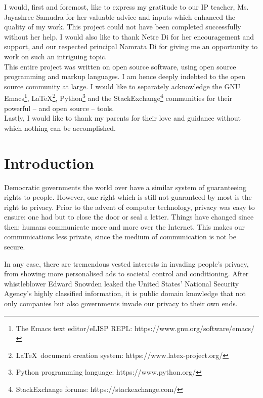 \documentclass{article}
\begin{document}
I would, first and foremost, like to express my gratitude to our IP teacher, Ms. Jayashree Samudra
for her valuable advice and inputs which enhanced the quality of my work. This project could not
have been completed successfully without her help. I would also like to thank Netre Di for her
encouragement and support, and our respected principal Namrata Di for giving me an opportunity to
work on such an intriguing topic. \\

This entire project was written on open source software, using open source programming and markup
languages. I am hence deeply indebted to the open source community at large. I would like to
separately acknowledge the GNU Emacs\footnote{The Emacs text editor/eLISP REPL:
https://www.gnu.org/software/emacs/}, \LaTeX\footnote{\LaTeX\ document creation system:
https://www.latex-project.org/}, Python\footnote{Python programming language:
https://www.python.org/} and the StackExchange\footnote{StackExchange forums:
https://stackexchange.com/} communities for their powerful -- and open source -- tools.\\

Lastly, I would like to thank my parents for their love and guidance without which nothing can be
accomplished.

\newpage

\tableofcontents

\newpage
\listoffigures


\newpage
\section{Introduction}
Democratic governments the world over have a similar system of guaranteeing rights to people.
However, one right which is still not guaranteed by most is the right to privacy. Prior to the
advent of computer technology, privacy was easy to ensure: one had but to close the door or seal a letter.
Things have changed since then: humans communicate more and more over the Internet. This makes our
communications less private, since the medium of communication is not be secure.

In any case, there are tremendous vested interests in invading people's privacy, from showing more
personalised ads to societal control and conditioning. After whistleblower Edward Snowden leaked
the United States' National Security Agency's highly classified information, it is public domain
knowledge that not only companies but also governments invade our privacy to their own ends.
\end{document}

